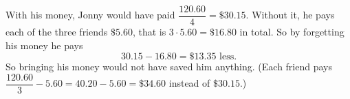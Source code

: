 With his money, Jonny would have paid $\dfrac{120.60}{4}=\$30.15$. Without it, he pays each of the three friends $\$5.60$, that is $3\cdot5.60=\$16.80$ in total. So by forgetting his money he pays
\[30.15-16.80=\boxed{\$13.35\text{ less}}.\]
So bringing his money would not have saved him anything. (Each friend pays $\dfrac{120.60}{3}-5.60=40.20-5.60=\$34.60$ instead of $\$30.15$.)
